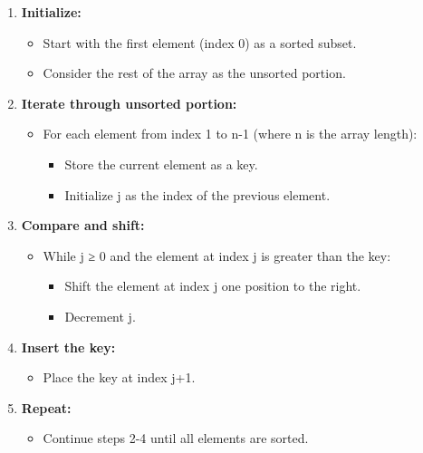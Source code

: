 \begin{enumerate}
\def\labelenumi{\arabic{enumi}.}
\tightlist
\item
  \textbf{Initialize:}

  \begin{itemize}
  \tightlist
  \item
    Start with the first element (index 0) as a sorted subset.
  \item
    Consider the rest of the array as the unsorted portion.
  \end{itemize}
\item
  \textbf{Iterate through unsorted portion:}

  \begin{itemize}
  \tightlist
  \item
    For each element from index 1 to n-1 (where n is the array length):

    \begin{itemize}
    \tightlist
    \item
      Store the current element as a key.
    \item
      Initialize j as the index of the previous element.
    \end{itemize}
  \end{itemize}
\item
  \textbf{Compare and shift:}

  \begin{itemize}
  \tightlist
  \item
    While j ≥ 0 and the element at index j is greater than the key:

    \begin{itemize}
    \tightlist
    \item
      Shift the element at index j one position to the right.
    \item
      Decrement j.
    \end{itemize}
  \end{itemize}
\item
  \textbf{Insert the key:}

  \begin{itemize}
  \tightlist
  \item
    Place the key at index j+1.
  \end{itemize}
\item
  \textbf{Repeat:}

  \begin{itemize}
  \tightlist
  \item
    Continue steps 2-4 until all elements are sorted.
  \end{itemize}
\end{enumerate}

